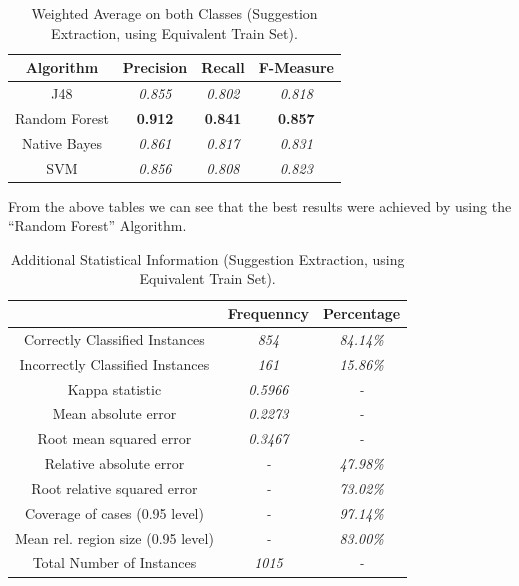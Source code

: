 \begin{table}[H]
\centering
\caption{Weighted Average on both Classes (Suggestion Extraction, using Equivalent Train Set).}
\label{411_table_rer}
\begin{tabular}{cccc}
\hline
{\bf Algorithm} & {\bf Precision} & {\bf Recall} & {\bf F-Measure} \\ \hline
J48             & {\it 0.855}     & {\it 0.802}  & {\it 0.818}     \\
Random Forest   & {\bf 0.912}     & {\bf 0.841}  & {\bf 0.857}     \\
Native Bayes    & {\it 0.861}     & {\it 0.817}  & {\it 0.831}     \\
SVM             & {\it 0.856}     & {\it 0.808}  & {\it 0.823}     \\ \hline
\end{tabular}
\end{table}

From the above tables we can see that the best results were achieved by using the ``Random Forest'' Algorithm.

\begin{table}[H]
\centering
\caption{Additional Statistical Information (Suggestion Extraction, using Equivalent Train Set).}
\label{412_table_rer}
\begin{tabular}{ccc}
\hline
                                   & {\bf Frequenncy} & {\bf Percentage} \\ \hline
Correctly Classified Instances     & {\it 854}        & {\it 84.14\%}    \\
Incorrectly Classified Instances   & {\it 161}        & {\it 15.86\%}    \\
Kappa statistic                    & {\it 0.5966}     & {\it -}          \\
Mean absolute error                & {\it 0.2273}     & {\it -}          \\
Root mean squared error            & {\it 0.3467}     & {\it -}          \\
Relative absolute error            & {\it -}          & {\it 47.98\%}    \\
Root relative squared error        & {\it -}          & {\it 73.02\%}    \\
Coverage of cases (0.95 level)     & {\it -}          & {\it 97.14\%}    \\
Mean rel. region size (0.95 level) & {\it -}          & {\it 83.00\%}    \\
Total Number of Instances          & {\it 1015}       & {\it -}          \\ \hline
\end{tabular}
\end{table}

